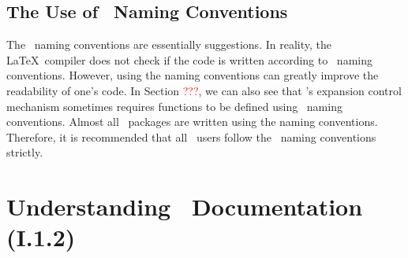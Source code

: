 \documentclass{ltugboat}
\begin{document}

\subsection{The Use of \liii\ Naming Conventions}

The \liii\ naming conventions are essentially suggestions. 
In reality, the \LaTeX\ compiler does not check if the code is written according to \liii\ naming conventions.
However, using the naming conventions can greatly improve the readability of one's code.
In Section \textcolor{red}{???}, we can also see that \liii's expansion control mechanism sometimes requires functions to be defined using \liii\ naming conventions.
Almost all \liii\ packages are written using the naming conventions.
Therefore, it is recommended that all \liii\ users follow the \liii\ naming conventions strictly.

\section{Understanding \liii\ Documentation (I.1.2)}
\end{document}
